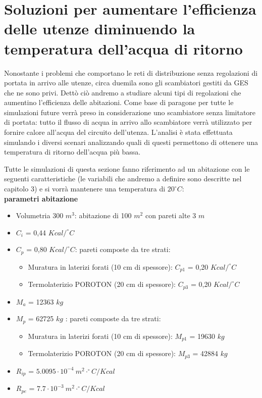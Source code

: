 \documentclass[laurea,oneside,11pt]{USiena_tesiLM}
\begin{document}
\section{Soluzioni per aumentare l'efficienza delle utenze diminuendo la temperatura dell'acqua di ritorno}
Nonostante i problemi che comportano le reti di distribuzione senza regolazioni di portata in arrivo alle utenze, circa duemila sono gli scambiatori gestiti da GES che ne sono privi.
Dettò ciò andremo a studiare alcuni tipi di regolazioni che aumentino l'efficienza delle abitazioni. 
Come base di paragone per tutte le simulazioni future verrà preso in considerazione uno scambiatore senza limitatore di portata: tutto il flusso di acqua in arrivo allo scambiatore verrà utilizzato per fornire calore all'acqua del circuito dell'utenza. 
L'analisi è stata effettuata  simulando i diversi scenari analizzando quali di questi permettono di ottenere una temperatura di ritorno dell'acqua più bassa.

Tutte le simulazioni di questa sezione fanno riferimento ad un abitazione con le seguenti caratteristiche (le variabili che andremo a definire sono descritte nel capitolo 3) e si vorrà mantenere una temperatura di $20 ^{\circ}C$:\\
\textbf{parametri abitazione }
\begin{itemize}
\item[] Volumetria 300 $m^3$: abitazione di 100 $m^2$ con pareti alte 3 $m$
\item[] $C_i$ = 0,44 $Kcal/^{\circ}C$
\item[] $C_p$ = 0,80 $Kcal/^{\circ}C$: pareti composte da tre strati:
\begin{itemize}
\item[] Muratura in laterizi forati (10 cm di spessore): $C_{p1}$ = 0,20 $Kcal/^{\circ}C$
\item[] Termolaterizio POROTON (20 cm di spessore): $C_{p3}$ = 0,20 $Kcal/^{\circ}C$ 
\end{itemize}
\item[] $M_a$ = 12363 $kg$
\item[] $M_p$ = 62725 $kg$ : pareti composte da tre strati:
\begin{itemize}
\item[] Muratura in laterizi forati (10 cm di spessore): $M_{p1}$ = 19630 $kg$
\item[] Termolaterizio POROTON (20 cm di spessore): $M_{p3}$ = 42884 $kg$ 
\end{itemize}
\item[] $R_{ip}$ = $5.0095 \cdot 10^{-4} \ m^2 \cdot ^{\circ}C / Kcal$
\item[] $R_{pe}$ = $7.7 \cdot 10^{-3}  \ m^2 \cdot ^{\circ}C / Kcal$

\end{itemize}
\end{document}
